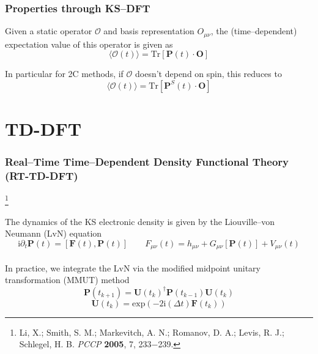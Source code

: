 \documentclass{beamer}
\newcommand{\bpar}[1]{\left( #1 \right)}                  %
\newcommand{\comm}[2]{\left[ #1 , #2\right]}
\renewcommand{\exp}[1]{\mathrm{exp}\bpar{#1}}
\newcommand\blfootnote[1]{%
  \begingroup
  \renewcommand\thefootnote{}\footnote{#1}%
  \addtocounter{footnote}{-1}%
  \endgroup
}
\begin{document}
\begin{frame}
\frametitle{Properties through KS--DFT}

Given a static operator $\mathcal{O}$ and basis representation $O_{\mu\nu}$, the (time--dependent) expectation value
of this operator is given as
\begin{equation*}
\langle \mathcal{O}(t) \rangle = \mathrm{Tr}[\mathbf{P}(t)\cdot\mathbf{O}]
\end{equation*}

In particular for 2C methods, if $\mathcal{O}$ doesn't depend on spin, this reduces to
\begin{equation*}
\langle \mathcal{O}(t) \rangle = \mathrm{Tr}[\mathbf{P}^S(t)\cdot\mathbf{O}]
\end{equation*}

\end{frame}

\section{TD-DFT}

\begin{frame}
\frametitle{Real--Time Time--Dependent Density Functional Theory (RT-TD-DFT)}
\blfootnote{Li, X.; Smith, S. M.; Markevitch, A. N.; Romanov, D. A.; Levis, R.
J.; Schlegel, H. B. \emph{PCCP} \textbf{2005}, 7, 233−239.}

The dynamics of the KS electronic density is given by the Liouville--von Neumann (LvN) equation
\begin{equation*}
  \mathrm{i}\partial_t\mathbf{P}(t) = \comm{\mathbf{F}(t)}{\mathbf{P}(t)} \qquad F_{\mu\nu}(t) = h_{\mu\nu} + G_{\mu\nu}[\mathbf{P}(t)] + V_{\mu\nu}(t)
\end{equation*}
~\\

In practice, we integrate the LvN via the modified midpoint unitary transformation (MMUT)
method
\begin{equation*}
\mathbf{P}(t_{k+1}) = \mathbf{U}(t_k)^\dagger \mathbf{P}(t_{k-1}) \mathbf{U}(t_k)
\end{equation*}
\begin{equation*}
\mathbf{U}(t_k) = \exp{-2\mathrm{i}(\Delta t) \mathbf{F}(t_k)}
\end{equation*}

\end{frame}
\end{document}
